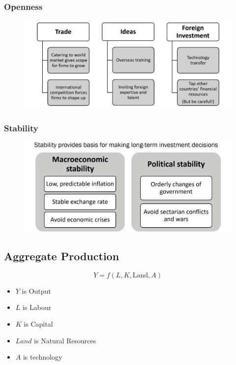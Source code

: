 \documentclass{article}
\begin{document}
\begin{multicols}{2}
\subsubsection{Openness}
\begin{figure}[H]
	\centering
	\includegraphics[width=\columnwidth]{images/openness.png}
\end{figure}
\subsubsection{Stability}
\begin{figure}[H]
	\centering
	\includegraphics[width=\columnwidth]{images/stability.png}
\end{figure}
\subsection{Aggregate Production}
$$Y = f(L, K, \text{Land}, A)$$
\begin{itemize}
	\item $Y$ is Output
	\item $L$ is Labour
	\item $K$ is Capital
	\item $Land$ is Natural Resources
	\item $A$ is technology
\end{itemize}

\end{multicols}
\end{document}
